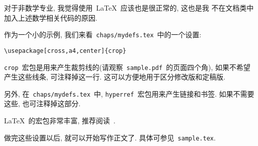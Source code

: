 对于非数学专业, 我觉得使用~\LaTeX~应该也是很正常的, 这也是我
不在文档类中加入上述数学相关代码的原因.

作为一个小的示例, 我们来看~\verb|chaps/mydefs.tex|~中的一个设置:
\begin{center}
\begin{verbatim}
\usepackage[cross,a4,center]{crop}
\end{verbatim}
\end{center}
\verb|crop|~宏包是用来产生裁剪线的(请观察~\verb|sample.pdf|~的页面四个角),
如果不希望产生这些线条, 可注释掉这一行. 这可以方便地用于区分修改版和定稿版.

另外, 在~\verb|chaps/mydefs.tex|~中, \verb|hyperref|~宏包用来产生链接和书签.
如果不需要这些, 也可注释掉这部分.

\LaTeX~的宏包非常丰富, 推荐阅读~\cite{ch8}.

做完这些设置以后, 就可以开始写作正文了. 具体可参见~\verb|sample.tex|.
